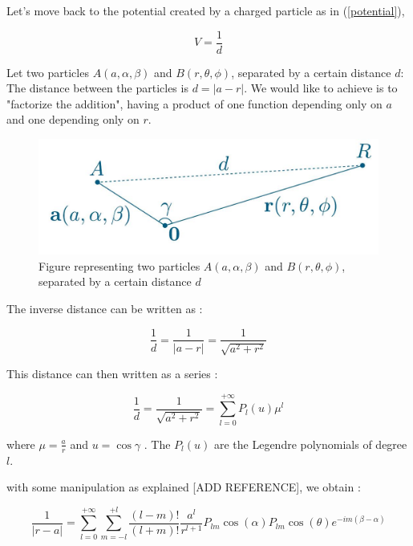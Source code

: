 \documentclass[11pt,twoside,a4paper]{report}
\begin{document}
	Let's move back to the potential created by a charged particle as in (\ref{potential}),
	
	\begin{equation*}
	V = \frac{1}{d}
	\end{equation*}
	
	Let two particles $A(a,\alpha,\beta)$ and $B(r,\theta,\phi)$, separated by a certain distance $d$: The distance between the particles is $d = |a - r|$.
	We would like to achieve is to "factorize the addition", having a product of one function depending only on $a$ and one depending only on $r$.
	
	
\begin{figure}[H]
\includegraphics[scale=0.4]{distance}
 \centering 
\caption{Figure representing two particles $A(a,\alpha,\beta)$ and $B(r,\theta,\phi)$, separated by a certain distance $d$}
\label{fig:poster}
\end{figure}	
	
	
	The inverse distance can be written as :
	
	\begin{equation*}
		\frac{1}{d} = \frac{1}{|a-r|} = \frac{1}{\sqrt{a^2 + r^2}}
	\end{equation*}

	This distance can then written as a series :
	
	\begin{equation}
		\frac{1}{d} = \frac{1}{\sqrt{a^2 + r^2}} = \sum\limits_{l=0}^{+\infty} P_l(u)\mu^l
	\end{equation}
	
	
	where $\mu = \frac{a}{r}$ and $u = \cos{\gamma}$ . The $P_l(u)$ are the Legendre polynomials of degree $l$.
	
	with some manipulation as explained [ADD REFERENCE], we obtain : 
	
	\begin{equation}
	\frac{1}{|r - a|} = \sum\limits_{l=0}^{+\infty} \sum\limits_{m = -l}^{+l} \frac{(l-m)!}{(l+m)!} \frac{a^l}{r^{l+1}} P_{lm}\cos{(\alpha)}P_{lm}\cos{(\theta)}e^{-im(\beta - \alpha)}
	\end{equation}
	
\end{document}
